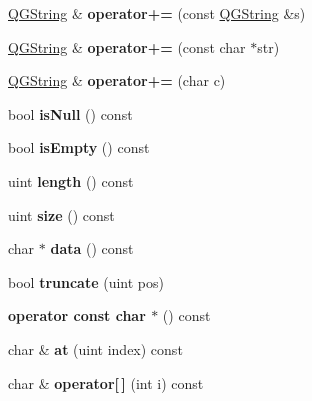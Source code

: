 \begin{DoxyCompactItemize}
\item 
\hypertarget{class_q_g_string_a12bda02ab954de20891bf05ba64935e4}{\hyperlink{class_q_g_string}{Q\-G\-String} \& {\bfseries operator+=} (const \hyperlink{class_q_g_string}{Q\-G\-String} \&s)}\label{class_q_g_string_a12bda02ab954de20891bf05ba64935e4}

\item 
\hypertarget{class_q_g_string_a2701a355ee4c934a10e42c1c09eca47a}{\hyperlink{class_q_g_string}{Q\-G\-String} \& {\bfseries operator+=} (const char $\ast$str)}\label{class_q_g_string_a2701a355ee4c934a10e42c1c09eca47a}

\item 
\hypertarget{class_q_g_string_a386cf533e91510926605950d41200096}{\hyperlink{class_q_g_string}{Q\-G\-String} \& {\bfseries operator+=} (char c)}\label{class_q_g_string_a386cf533e91510926605950d41200096}

\item 
\hypertarget{class_q_g_string_ac02f2a4d7312eb91f40980adfd4e31b2}{bool {\bfseries is\-Null} () const }\label{class_q_g_string_ac02f2a4d7312eb91f40980adfd4e31b2}

\item 
\hypertarget{class_q_g_string_a479432127ee77145cc19d6a2d1590821}{bool {\bfseries is\-Empty} () const }\label{class_q_g_string_a479432127ee77145cc19d6a2d1590821}

\item 
\hypertarget{class_q_g_string_ab0edbf251efc0562d70132e931e3cf06}{uint {\bfseries length} () const }\label{class_q_g_string_ab0edbf251efc0562d70132e931e3cf06}

\item 
\hypertarget{class_q_g_string_a7e63723212bed1ca52f0fe57e58b812e}{uint {\bfseries size} () const }\label{class_q_g_string_a7e63723212bed1ca52f0fe57e58b812e}

\item 
\hypertarget{class_q_g_string_ad9319003da5b44fcac43001237ecb9cd}{char $\ast$ {\bfseries data} () const }\label{class_q_g_string_ad9319003da5b44fcac43001237ecb9cd}

\item 
\hypertarget{class_q_g_string_a1546e903bdbf7b496b4f8b05a5ff908d}{bool {\bfseries truncate} (uint pos)}\label{class_q_g_string_a1546e903bdbf7b496b4f8b05a5ff908d}

\item 
\hypertarget{class_q_g_string_abdd0820f8401e11e09a1e92ab7f4d864}{{\bfseries operator const char $\ast$} () const }\label{class_q_g_string_abdd0820f8401e11e09a1e92ab7f4d864}

\item 
\hypertarget{class_q_g_string_aa9c68e01ab6fb8a2cc82f070251c40ab}{char \& {\bfseries at} (uint index) const }\label{class_q_g_string_aa9c68e01ab6fb8a2cc82f070251c40ab}

\item 
\hypertarget{class_q_g_string_aa26690d818962b4f4043781f42d6b350}{char \& {\bfseries operator\mbox{[}$\,$\mbox{]}} (int i) const }\label{class_q_g_string_aa26690d818962b4f4043781f42d6b350}

\end{DoxyCompactItemize}


